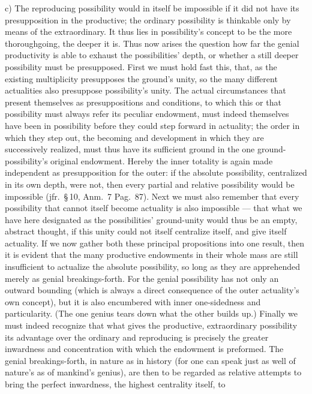 \documentclass[12pt]{book}
\begin{document}
c) The reproducing possibility would in itself be impossible if it did not
have its presupposition in the productive; the ordinary possibility is
thinkable only by means of the extraordinary. It thus lies in possibility's
concept to be the more thoroughgoing, the deeper it is. Thus now arises the
question how far the genial productivity is able to exhaust the
possibilities' depth, or whether a still deeper possibility must be
presupposed. First we must hold fast this, that, as the existing
multiplicity presupposes the ground's unity, so the many different
actualities also presuppose possibility's unity. The actual circumstances
that present themselves as presuppositions and conditions, to which this or
that possibility must always refer its peculiar endowment, must indeed
themselves have been in possibility before they could step forward in
actuality; the order in which they step out, the becoming and development in
which they are successively realized, must thus have its sufficient ground
in the one ground-possibility's original endowment. Hereby the inner
totality is again made independent as presupposition for the outer: if the
absolute possibility, centralized in its own depth, were not, then every
partial and relative possibility would be impossible (jfr.\ \S\,10, Anm.\ 7
Pag.\ 87). Next we must also remember that every possibility that cannot
itself become actuality is also impossible --- that what we have here
designated as the possibilities' ground-unity would thus be an empty,
abstract thought, if this unity could not itself centralize itself, and give
itself actuality. If we now gather both these principal propositions into
one result, then it is evident that the many productive endowments in their
whole mass are still insufficient to actualize the absolute possibility, so
long as they are apprehended merely as genial breakings-forth. For the
genial possibility has not only an outward bounding (which is always a
direct consequence of the outer actuality's own concept), but it is also
encumbered with inner one-sidedness and particularity. (The one genius tears
down what the other builds up.) Finally we must indeed recognize that what
gives the productive, extraordinary possibility its advantage over the
ordinary and reproducing is precisely the greater inwardness and
concentration with which the endowment is preformed. The genial
breakings-forth, in nature as in history (for one can speak just as well of
nature's as of mankind's genius), are then to be regarded as relative
attempts to bring the perfect inwardness, the highest centrality itself, to
\end{document}
